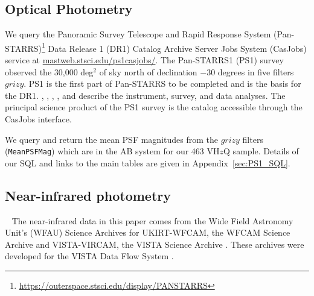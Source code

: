 \documentclass[usenatbib]{mnras}
\begin{document}
        
\subsection{Optical Photometry}
We query the Panoramic Survey Telescope and Rapid Response System
(Pan-STARRS)\footnote{\href{https://outerspace.stsci.edu/display/PANSTARRS}{https://outerspace.stsci.edu/display/PANSTARRS}}
Data Release 1 (DR1) Catalog Archive Server Jobs System (CasJobs)
service at
\href{http://mastweb.stsci.edu/ps1casjobs/}{mastweb.stsci.edu/ps1casjobs/}. The
Pan-STARRS1 (PS1) survey observed the 30,000 deg$^{2}$ of sky north of
declination $-30$ degrees in five filters $grizy$.  PS1 is the first
part of Pan-STARRS to be completed and is the basis for the DR1.
\citet{Chambers2016}, \citet{Magnier2016a}, \citet{Waters2016},
\citet{Magnier2016b}, \citet{Magnier2016c} and \citet{Flewelling2016}
describe the instrument, survey, and data analyses.  The principal
science product of the PS1 survey is the catalog accessible through
the CasJobs interface.
    
We query and return the mean PSF magnitudes from the $grizy$ filters
({\tt MeanPSFMag}) which are in the AB system for our 463 VH$z$Q
sample. Details of our SQL and links to the main tables are given in
Appendix~\ref{sec:PS1_SQL}.
    
    \iffalse
    \subsubsection{DECam} 
    The Dark Energy Camera \citep[DECam][]{Flaugher2015} is 
    is a wide-field imager with a 2.2 degree diameter field of view 
    mounted at the prime focus of the Victor M. Blanco 4 m telescope 
    at the Cerro Tololo International Observatory. We use data 
    from both the Dark Energy Survey \citep[DES; ][]{DES2016} and 
    the DESI Legacy Imaging Survey \citep[DECaLS; ][]{Dey2018}. 
    \fi
    

\subsection{Near-infrared photometry}~\label{sec:NIR_data} 
The near-infrared data in this paper comes from the Wide Field Astronomy Unit's
(WFAU) Science Archives for UKIRT-WFCAM, the WFCAM Science Archive
\citep[WSA][]{WSA} and VISTA-VIRCAM, the VISTA Science Archive
\citep[VSA][]{VSA}. These archives were developed for the VISTA Data Flow System
\citep[VDFS][]{VDFS}.
\end{document}
